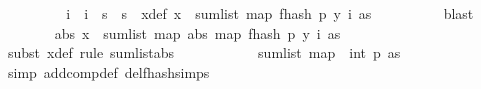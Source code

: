 \begin{isabellebody}
\ \ \ \ \ \ \isamarkupfalse%
\ \isamarkupfalse%
\ i\ \ {\isachardoublequoteopen}i\ {\isasymin}\ {\isacharbraceleft}{\kern0pt}{}{\isachardot}{\kern0pt}{\isachardot}{\kern0pt}{\isacharless}{\kern0pt}s\ {\isasymtimes}\ {\isacharbraceleft}{\kern0pt}{}{\isachardot}{\kern0pt}{\isachardot}{\kern0pt}{\isacharless}{\kern0pt}s\ \ x{\isacharunderscore}{\kern0pt}def{\isacharcolon}{\kern0pt}\ {\isachardoublequoteopen}x\ {\isacharequal}{\kern0pt}\ sum{\isacharunderscore}{\kern0pt}list\ {\isacharparenleft}{\kern0pt}map\ {\isacharparenleft}{\kern0pt}f{}{\isacharunderscore}{\kern0pt}hash\ p\ {\isacharparenleft}{\kern0pt}y\ i{\isacharparenright}{\kern0pt}{\isacharparenright}{\kern0pt}\ as{\isacharparenright}{\kern0pt}{\isachardoublequoteclose}\isanewline
\ \ \ \ \ \ \ \ \isamarkupfalse%
\ blast\isanewline
\ \ \ \ \ \ \isamarkupfalse%
\ {\isachardoublequoteopen}abs\ x\ {\isasymle}\ sum{\isacharunderscore}{\kern0pt}list\ {\isacharparenleft}{\kern0pt}map\ abs\ {\isacharparenleft}{\kern0pt}map\ {\isacharparenleft}{\kern0pt}f{}{\isacharunderscore}{\kern0pt}hash\ p\ {\isacharparenleft}{\kern0pt}y\ i{\isacharparenright}{\kern0pt}{\isacharparenright}{\kern0pt}\ as{\isacharparenright}{\kern0pt}{\isacharparenright}{\kern0pt}{\isachardoublequoteclose}\isanewline
\ \ \ \ \ \ \ \ \isamarkupfalse%
\ {\isacharparenleft}{\kern0pt}subst\ x{\isacharunderscore}{\kern0pt}def{\isacharcomma}{\kern0pt}\ rule\ sum{\isacharunderscore}{\kern0pt}list{\isacharunderscore}{\kern0pt}abs{\isacharparenright}{\kern0pt}\isanewline
\ \ \ \ \ \ \isamarkupfalse%
\ \isamarkupfalse%
\ {\isachardoublequoteopen}{\isachardot}{\kern0pt}{\isachardot}{\kern0pt}{\isachardot}{\kern0pt}\ {\isasymle}\ sum{\isacharunderscore}{\kern0pt}list\ {\isacharparenleft}{\kern0pt}map\ {\isacharparenleft}{\kern0pt}{\isasymlambda}{\isacharunderscore}{\kern0pt}{\isachardot}{\kern0pt}\ {\isacharparenleft}{\kern0pt}int\ p{\isacharplus}{\kern0pt}{}{\isacharparenright}{\kern0pt}{\isacharparenright}{\kern0pt}\ as{\isacharparenright}{\kern0pt}{\isachardoublequoteclose}\isanewline
\ \ \ \ \ \ \ \ \isamarkupfalse%
\ {\isacharparenleft}{\kern0pt}simp\ add{\isacharcolon}{\kern0pt}comp{\isacharunderscore}{\kern0pt}def\ del{\isacharcolon}{\kern0pt}f{}{\isacharunderscore}{\kern0pt}hash{\isachardot}{\kern0pt}simps{\isacharparenright}{\kern0pt}\isanewline

\end{isabellebody}
